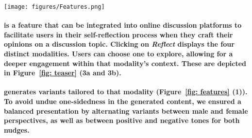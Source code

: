 \begin{figure*}[!htbp]
  \centering
  \texttt{[image: figures/Features.png]}
  \caption{Key features in interface. \textbf{1:} Users can click on the \textit{Recreate} button to browse through different variants under a specific modality or \textbf{2:} click on the \textit{Exit Reflect} button to navigate back to the different array of modalities to choose another modality. Additional features are present for storytelling to allow users to \textbf{3a:} track their reading process and \textbf{3b:} continue with their reading on the current story. \textbf{4:} For audio and video formats in both direct and indirect reflective nudges, the primary difference is duration. In direct reflective nudges, audio and video average 9 to 12 seconds, while in indirect nudges, the duration extends to 90 to 120 seconds, reflecting typical short-form media content.}
  \label{fig: features}
\end{figure*}

\paragraph{ is a feature that can be integrated into online discussion platforms to facilitate users in their self-reflection process when they craft their opinions on a discussion topic. Clicking on \textit{Reflect} displays the four distinct modalities. Users can choose one to explore, allowing for a deeper engagement within that modality’s context. These are depicted in Figure~\ref{fig: teaser} (3a and 3b).} 

\paragraph{ generates variants tailored to that modality (Figure~\ref{fig: features} (1)). To avoid undue one-sidedness in the generated content, we ensured a balanced presentation by alternating variants between male and female perspectives, as well as between positive and negative tones for both nudges.}


